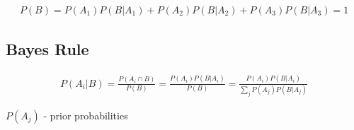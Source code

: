 \begin{align}
P(B)=P(A_1)P(B|A_1) + P(A_2)P(B|A_2) + P(A_3)P(B|A_3) = 1
\end{align}

\subsection{Bayes Rule}

\begin{align}
P(A_i|B) = \frac{P(A_i \cap B)}{P(B)} = \frac{P(A_i)P(B|A_i)}{P(B)} = \frac{P(A_i)P(B|A_i)}{\sum_j P(A_j)P(B|A_j)}
\end{align}

$P(A_j)$ - prior probabilities
